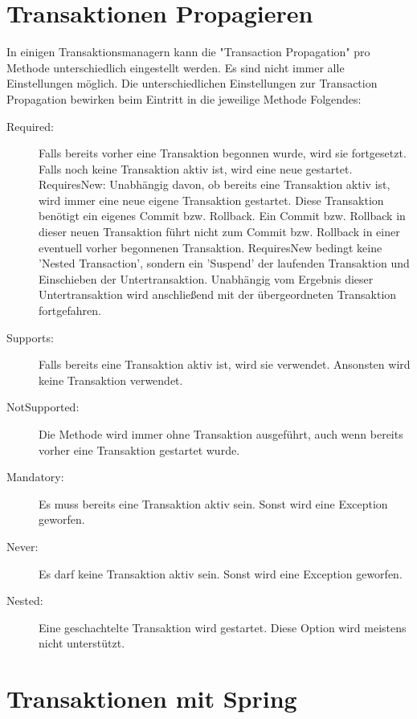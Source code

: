 \documentclass[a4paper,10pt]{scrreprt}
\begin{document}
\section{Transaktionen Propagieren}
In einigen Transaktionsmanagern kann die "Transaction Propagation" pro Methode unterschiedlich
eingestellt werden. Es sind nicht immer alle Einstellungen möglich. Die unterschiedlichen
Einstellungen zur Transaction Propagation bewirken beim Eintritt in die jeweilige Methode
Folgendes:
\begin{description}
\item[Required:] Falls bereits vorher eine Transaktion begonnen wurde, wird sie fortgesetzt. Falls
noch keine Transaktion aktiv ist, wird eine neue gestartet.
RequiresNew: Unabhängig davon, ob bereits eine Transaktion aktiv ist, wird immer eine neue
eigene Transaktion gestartet. Diese Transaktion benötigt ein eigenes Commit bzw.
Rollback. Ein Commit bzw. Rollback in dieser neuen Transaktion führt nicht zum
Commit bzw. Rollback in einer eventuell vorher begonnenen Transaktion.
RequiresNew bedingt keine 'Nested Transaction', sondern ein 'Suspend' der
laufenden Transaktion und Einschieben der Untertransaktion. Unabhängig vom
Ergebnis dieser Untertransaktion wird anschließend mit der übergeordneten
Transaktion fortgefahren.
\item[Supports:]
Falls bereits eine Transaktion aktiv ist, wird sie verwendet. Ansonsten wird keine
Transaktion verwendet.
\item[NotSupported:] Die Methode wird immer ohne Transaktion ausgeführt, auch wenn bereits vorher
eine Transaktion gestartet wurde.
\item[Mandatory:] Es muss bereits eine Transaktion aktiv sein. Sonst wird eine Exception geworfen.
\item[Never:] Es darf keine Transaktion aktiv sein. Sonst wird eine Exception geworfen.
\item[Nested:] Eine geschachtelte Transaktion wird gestartet. Diese Option wird meistens nicht
       unterstützt.
\end{description}

\section{Transaktionen mit Spring}
\end{document}
